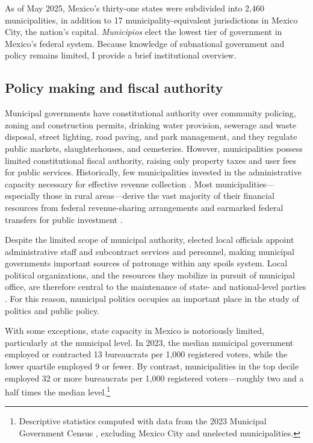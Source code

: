 \documentclass[letter,12pt]{article}
\begin{document}
As of May 2025, Mexico's thirty-one states were subdivided into 2,460 municipalities, in addition to 17 municipality-equivalent jurisdictions in Mexico City, the nation's capital. \emph{Municipios} elect the lowest tier of government in Mexico's federal system. Because knowledge of subnational government and policy remains limited, I provide a brief institutional overview.

\subsection{Policy making and fiscal authority}

Municipal governments have constitutional authority over community policing, zoning and construction permits, drinking water provision, sewerage and waste disposal, street lighting, road paving, and park management, and they regulate public markets, slaughterhouses, and cemeteries. However, municipalities possess limited constitutional fiscal authority, raising only property taxes and user fees for public services. Historically, few municipalities invested in the administrative capacity necessary for effective revenue collection \citep{garfias.state.cap.2018}. Most municipalities---especially those in rural areas---derive the vast majority of their financial resources from federal revenue-sharing arrangements and earmarked federal transfers for public investment \citep{diaz.cayeros.2006, figueroa-mansur-itam.2024}.

Despite the limited scope of municipal authority, elected local officials appoint administrative staff and subcontract services and personnel, making municipal governments important sources of patronage within any spoils system. Local political organizations, and the resources they mobilize in pursuit of municipal office, are therefore central to the maintenance of state- and national-level parties \citep{ames.1970, coppedge.MxVen.1993, key.1964, rosas.lucardi.Brokers.2019}. For this reason, municipal politics occupies an important place in the study of politics and public policy.

With some exceptions, state capacity in Mexico is notoriously limited, particularly at the municipal level. In 2023, the median municipal government employed or contracted 13 bureaucrats per 1,000 registered voters, while the lower quartile employed 9 or fewer. By contrast, municipalities in the top decile employed 32 or more bureaucrats per 1,000 registered voters---roughly two and a half times the median level.\footnote{Descriptive statistics computed with data from the 2023 Municipal Government Census \citep{inegi.CensoGobMun2023}, excluding Mexico City and unelected municipalities.}
\end{document}
